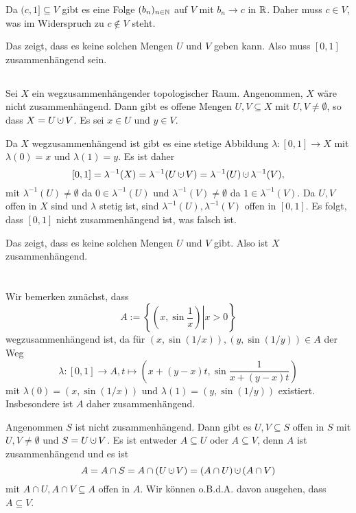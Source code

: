 \documentclass[a4paper,10pt]{article}
\begin{document}
Da $(c,1] \subseteq V$ gibt es eine Folge $(b_n)_{n \in \mathbb{N}}$ auf $V$ mit $b_n \to c$ in $\mathbb{R}$. Daher muss $c \in V$, was im Widerspruch zu $c \not\in V$ steht.

Das zeigt, dass es keine solchen Mengen $U$ und $V$ geben kann. Also muss $[0,1]$ zusammenhängend sein.


\subsection{}
Sei $X$ ein wegzusammenhängender topologischer Raum. Angenommen, $X$ wäre nicht zusammenhängend. Dann gibt es offene Mengen $U, V \subseteq X$ mit $U, V \neq \emptyset$, so dass $X = U \dotcup V$. Es sei $x \in U$ und $y \in V$.

Da $X$ wegzusammenhängend ist gibt es eine stetige Abbildung $\lambda : [0,1] \to X$ mit $\lambda(0) = x$ und $\lambda(1) = y$. Es ist daher
\[
 [0,1] = \lambda^{-1}(X) = \lambda^{-1}(U \dotcup V) = \lambda^{-1}(U) \dotcup \lambda^{-1}(V),
\]
mit $\lambda^{-1}(U) \neq \emptyset$ da $0 \in \lambda^{-1}(U)$ und $\lambda^{-1}(V) \neq \emptyset$ da $1 \in \lambda^{-1}(V)$. Da $U, V$ offen in $X$ sind und $\lambda$ stetig ist, sind $\lambda^{-1}(U), \lambda^{-1}(V)$ offen in $[0,1]$. Es folgt, dass $[0,1]$ nicht zusammenhängend ist, was falsch ist.

Das zeigt, dass es keine solchen Mengen $U$ und $V$ gibt. Also ist $X$ zusammenhängend.





\section{}


\subsection{}
Wir bemerken zunächst, dass
\[
 A := \left\{ \left. \left(x,\sin\frac{1}{x}\right) \right| x > 0\right\}
\]
wegzusammenhängend ist, da für $(x,\sin(1/x)), (y,\sin(1/y)) \in A$ der Weg
\[
 \lambda : [0,1] \to A, t \mapsto \left(x+(y-x)t, \sin \frac{1}{x+(y-x)t}\right)
\]
mit $\lambda(0) = (x,\sin(1/x))$ und $\lambda(1) = (y,\sin(1/y))$ existiert. Insbesondere ist $A$ daher zusammenhängend.

Angenommen $S$ ist nicht zusammenhängend. Dann gibt es $U,V \subseteq S$ offen in $S$ mit $U, V \neq \emptyset$ und $S = U \dotcup V$. Es ist entweder $A \subseteq U$ oder $A \subseteq V$, denn $A$ ist zusammenhängend und es ist
\[
 A = A \cap S = A \cap (U \dotcup V) = (A \cap U) \dotcup (A \cap V)
\]
mit $A \cap U, A \cap V \subseteq A$ offen in $A$. Wir können o.B.d.A. davon ausgehen, dass $A \subseteq V$.
\end{document}
